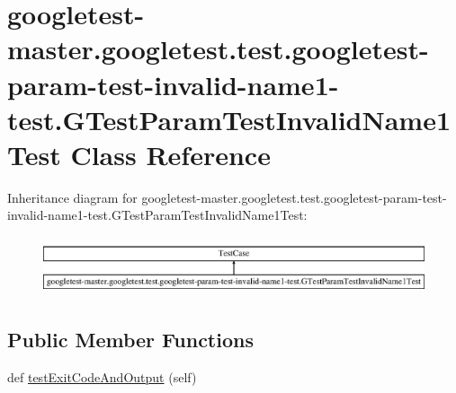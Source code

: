 \hypertarget{classgoogletest-master_1_1googletest_1_1test_1_1googletest-param-test-invalid-name1-test_1_1_g_tf880334fd9d35194c26b114edbd24da2}{}\section{googletest-\/master.googletest.\+test.\+googletest-\/param-\/test-\/invalid-\/name1-\/test.G\+Test\+Param\+Test\+Invalid\+Name1\+Test Class Reference}
\label{classgoogletest-master_1_1googletest_1_1test_1_1googletest-param-test-invalid-name1-test_1_1_g_tf880334fd9d35194c26b114edbd24da2}
Inheritance diagram for googletest-\/master.googletest.\+test.\+googletest-\/param-\/test-\/invalid-\/name1-\/test.G\+Test\+Param\+Test\+Invalid\+Name1\+Test\+:\begin{figure}[H]
\begin{center}
\leavevmode
\includegraphics[height=1.744548cm]{d9/dd0/classgoogletest-master_1_1googletest_1_1test_1_1googletest-param-test-invalid-name1-test_1_1_g_tf880334fd9d35194c26b114edbd24da2}
\end{center}
\end{figure}
\subsection*{Public Member Functions}
\begin{DoxyCompactItemize}
\item 
def \mbox{\hyperlink{classgoogletest-master_1_1googletest_1_1test_1_1googletest-param-test-invalid-name1-test_1_1_g_tf880334fd9d35194c26b114edbd24da2_a9d776d597f244f947c3ba826fe86a8c2}{test\+Exit\+Code\+And\+Output}} (self)
\end{DoxyCompactItemize}


